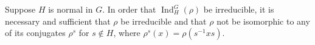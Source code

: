 Suppose $H$ is normal in $G$. In order that $\operatorname{Ind}_H^G(\rho)$ be irreducible, it is necessary and sufficient that $\rho$ be irreducible and that $\rho$ not be isomorphic to any of its conjugates $\rho^s$ for $s \notin H$, where $\rho^s(x) = \rho(s^{-1}xs)$.

